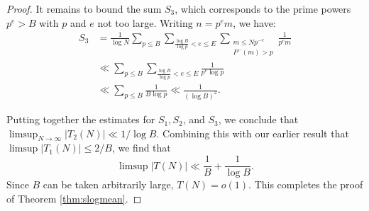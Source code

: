 \documentclass[11pt, reqno]{amsart}
\theoremstyle{remark}
\numberwithin{theorem}{section}
\numberwithin{proposition}{section}
\numberwithin{lemma}{section}
\numberwithin{corollary}{section}
\numberwithin{equation}{section}
\numberwithin{conjecture}{section}
\numberwithin{definition}{section}
\begin{document}
\begin{proof}
It remains to bound the sum $S_3$, which corresponds to the prime powers $p^e>B$ with $p$ and $e$ not too large. Writing $n=p^e m$, we have:
\begin{equation*}
\begin{split}
S_3 &= \frac{1}{\log N}
\sum_{p\le B}
\sum_{\frac{\log B}{\log p}<e\le E}
\sum_{\substack{{m\le Np^{-e}}\\ {P^-(m)>p}}}
\frac{1}{p^em}\\
&\ll 
\sum_{p\le B}
\sum_{\frac{\log B}{\log p}<e\le E}\frac{1}{p^e\log p}\\
&\ll \sum_{p\le B}\frac{1}{B\log p}\ll \frac{1}{(\log B)^2}.
\end{split}
\end{equation*}

Putting together the estimates for $S_1, S_2$, and $S_3$, we conclude that $\limsup_{N\to\infty} |T_2(N)| \ll 1/\log{B}$. Combining this with our earlier result that $\limsup |T_1(N)| \le 2/B$, we find that
\[ \limsup |T(N)|  \ll \frac{1}{B} + \frac{1}{\log{B}}. \]
Since $B$ can be taken arbitrarily large, $T(N) = o(1)$. This completes the proof of Theorem \ref{thm:slogmean}.


\end{proof}
\end{document}
